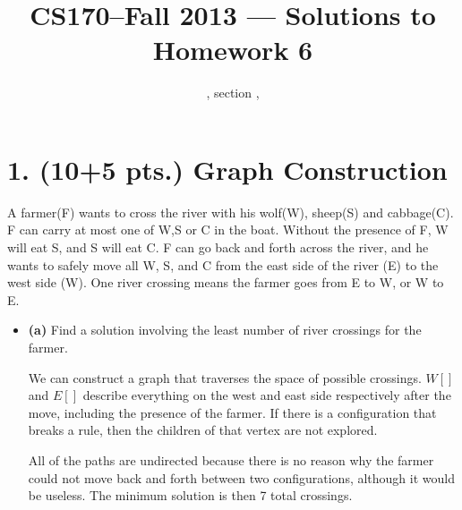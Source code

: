 \documentclass[11pt]{article}
\title{CS170--Fall 2013 --- Solutions to Homework 6}
\author{\Name, section \Sec, \texttt{\Login}}
\begin{document}
\maketitle

\section*{1. (10+5 pts.) Graph Construction}


A farmer(F) wants to cross the river with his wolf(W), sheep(S) and cabbage(C). F can carry at most one of W,S or C in the boat. Without the presence of F, W will eat S, and S will eat C. F can go back and forth across the river, and he wants to safely move all W, S, and C from the east side of the river (E) to the west side (W). One river crossing means the farmer goes from E to W, or W to E.
\begin{itemize}
\item[] {\bf (a)} Find a solution involving the least number of river crossings for the farmer.

We can construct a graph that traverses the space of possible crossings. $W[] $ and $ E[] $ describe everything on the west and east side respectively after the move, including the presence of the farmer. If there is a configuration that breaks a rule, then the children of that vertex are not explored.


All of the paths are undirected because there is no reason why the farmer could not move back and forth between two configurations, although it would be useless. The minimum solution is then 7 total crossings.
\end{itemize}
\label{pg:end-of-p1}
%
\end{document}
